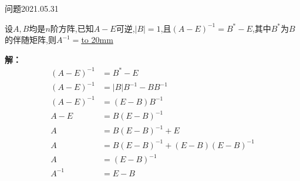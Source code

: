 \begin{mybox}{问题2021.05.31}
	
	\qquad 设$A,B$均是$n$阶方阵,已知$A-E$可逆,$\left|B\right|=1$,且$(A-E)^{-1}=B^{*}-E$,其中$B^{*}$为$B$的伴随矩阵,则$A^{-1}=$\underline{\hbox to 20mm{}}
\end{mybox}	
\noindent
\textbf{解：}
\begin{align*}
	(A-E)^{-1}&=B^{*}-E\\
	(A-E)^{-1}&=\left|B\right| B^{-1} -BB^{-1}\\
	(A-E)^{-1}&=(E-B)B^{-1}\\
	A-E&=B(E-B)^{-1}\\
	A&=B(E-B)^{-1}+E\\
	A&=B(E-B)^{-1}+(E-B)(E-B)^{-1}\\
	A&=(E-B)^{-1}\\
	A^{-1}&=E-B
\end{align*}